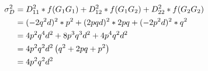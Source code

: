 \documentclass[
]{book}
\theoremstyle{definition}
\theoremstyle{definition}
\theoremstyle{definition}
\theoremstyle{remark}
\begin{document}
\begin{align}
\sigma_D^2  &=  D_{11}^2 * f(G_1G_1) + D_{12}^2 * f(G_1G_2) + D_{22}^2 * f(G_2G_2) \notag \\
            &=   (- 2q^2d)^2 * p^2 + (2pqd)^2 * 2pq + (- 2p^2d)^2 * q^2 \notag \\
            &=  4p^2q^4d^2 + 8p^3q^3d^2 + 4p^4q^2d^2 \notag \\
            &=  4p^2q^2d^2 \left( q^2 + 2pq + p^2 \right) \notag \\
            &=  4p^2q^2d^2 
\label{eq:VarDom}
\end{align}

  
\end{document}
